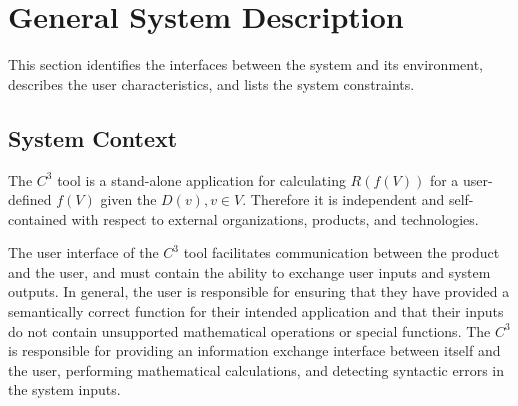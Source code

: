 \documentclass[12pt]{article}
\newcommand{\prognameAbbrv}{$C^{3}$}
\begin{document}
\section{General System Description}
\label{general}

This section identifies the interfaces between the system and its environment,
describes the user characteristics, and lists the system constraints.

\subsection{System Context}
The \prognameAbbrv{} tool is a stand-alone application for calculating 
$R(f(V))$ for a user-defined $f(V)$ given the $D(v), v\in V$. Therefore 
it is independent and self-contained with respect to external organizations, 
products, and technologies.

The user interface of the \prognameAbbrv{} tool facilitates communication 
between the product and the user, and must contain the ability to exchange user 
inputs and system outputs. In general, the user is responsible for ensuring 
that they have provided a semantically correct function for their intended 
application and that their inputs do not contain unsupported mathematical 
operations or special functions. The \prognameAbbrv{} is responsible for 
providing an information exchange interface between itself and the user, 
performing mathematical calculations, and detecting syntactic errors in the 
system inputs.
\end{document}
